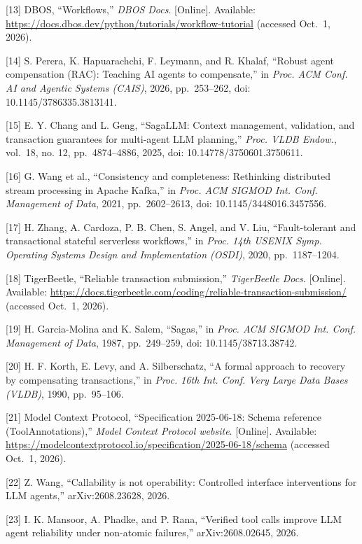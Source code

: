\documentclass[
  10pt,
]{article}
\begin{document}
{[}13{]} DBOS, ``Workflows,'' \emph{DBOS Docs}. {[}Online{]}. Available: \url{https://docs.dbos.dev/python/tutorials/workflow-tutorial} (accessed
Oct.~1, 2026).

{[}14{]} S. Perera, K. Hapuarachchi, F. Leymann, and R. Khalaf, ``Robust
agent compensation (RAC): Teaching AI agents to compensate,'' in
\emph{Proc. ACM Conf. AI and Agentic Systems (CAIS)}, 2026,
pp.~253--262, doi: 10.1145/3786335.3813141.

{[}15{]} E. Y. Chang and L. Geng, ``SagaLLM: Context management,
validation, and transaction guarantees for multi-agent LLM planning,''
\emph{Proc. VLDB Endow.}, vol.~18, no. 12, pp.~4874--4886, 2025, doi:
10.14778/3750601.3750611.

{[}16{]} G. Wang et al., ``Consistency and completeness: Rethinking
distributed stream processing in Apache Kafka,'' in \emph{Proc. ACM
SIGMOD Int. Conf. Management of Data}, 2021, pp.~2602--2613, doi:
10.1145/3448016.3457556.

{[}17{]} H. Zhang, A. Cardoza, P. B. Chen, S. Angel, and V. Liu,
``Fault-tolerant and transactional stateful serverless workflows,'' in
\emph{Proc. 14th USENIX Symp. Operating Systems Design and
Implementation (OSDI)}, 2020, pp.~1187--1204.

{[}18{]} TigerBeetle, ``Reliable transaction submission,''
\emph{TigerBeetle Docs}. {[}Online{]}. Available: \url{https://docs.tigerbeetle.com/coding/reliable-transaction-submission/}
(accessed Oct.~1, 2026).

{[}19{]} H. Garcia-Molina and K. Salem, ``Sagas,'' in \emph{Proc. ACM
SIGMOD Int. Conf. Management of Data}, 1987, pp.~249--259, doi:
10.1145/38713.38742.

{[}20{]} H. F. Korth, E. Levy, and A. Silberschatz, ``A formal approach
to recovery by compensating transactions,'' in \emph{Proc. 16th Int.
Conf. Very Large Data Bases (VLDB)}, 1990, pp.~95--106.

{[}21{]} Model Context Protocol, ``Specification 2025-06-18: Schema
reference (ToolAnnotations),'' \emph{Model Context Protocol website}.
{[}Online{]}. Available: \url{https://modelcontextprotocol.io/specification/2025-06-18/schema}
(accessed Oct.~1, 2026).

{[}22{]} Z. Wang, ``Callability is not operability: Controlled interface
interventions for LLM agents,'' arXiv:2608.23628, 2026.

{[}23{]} I. K. Mansoor, A. Phadke, and P. Rana, ``Verified tool calls
improve LLM agent reliability under non-atomic failures,''
arXiv:2608.02645, 2026.
\end{document}
